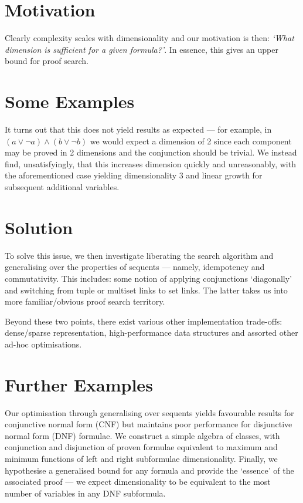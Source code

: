 \documentclass{article}
\theoremstyle{indented}
\begin{document}
    \section*{Motivation}
        Clearly complexity scales with dimensionality and our motivation is then: \textit{`What dimension is sufficient for a given formula?'}.
        In essence, this gives an upper bound for proof search.

    \section*{Some Examples}
        It turns out that this does not yield results as expected --- for example, in $(a \vee \neg a) \wedge (b \vee \neg b)$ we would expect a dimension of 2 since each component may be proved in 2 dimensions and the conjunction should be trivial.
        We instead find, unsatisfyingly, that this increases dimension quickly and unreasonably, with the aforementioned case yielding dimensionality 3 and linear growth for subsequent additional variables.

    \section*{Solution}
        To solve this issue, we then investigate liberating the search algorithm and generalising over the properties of sequents --- namely, idempotency and commutativity.
        This includes: some notion of applying conjunctions `diagonally' and switching from tuple or multiset links to set links.
        The latter takes us into more familiar/obvious proof search territory.
        
        Beyond these two points, there exist various other implementation trade-offs: dense/sparse representation, high-performance data structures and assorted other ad-hoc optimisations.

    \section*{Further Examples}
        Our optimisation through generalising over sequents yields favourable results for conjunctive normal form (CNF) but maintains poor performance for disjunctive normal form (DNF) formulae.
        We construct a simple algebra of classes, with conjunction and disjunction of proven formulae equivalent to maximum and minimum functions of left and right subformulae dimensionality.
        Finally, we hypothesise a generalised bound for any formula and provide the `essence' of the associated proof --- we expect dimensionality to be equivalent to the most number of variables in any DNF subformula.
\end{document}
